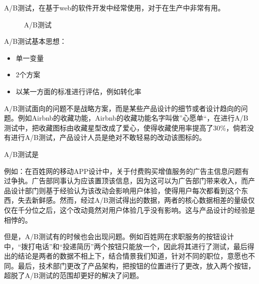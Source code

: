 \documentclass[letterpaper,11pt,english]{sphinxmanual}
\begin{document}
A/B测试，在基于web的软件开发中经常使用，对于在生产中非常有用。

\begin{figure}[H]
\centering
\capstart

\noindent{}
\caption{A/B测试\sphinxfootnotemark[866]}\label{\detokenize{chapter_AI_dive/huidu:id3}}\end{figure}
%
\begin{footnotetext}[866]\sphinxAtStartFootnote
{}
%
\end{footnotetext}\ignorespaces 
A/B测试基本思想：
\begin{itemize}
\item {} 
单一变量

\item {} 
2个方案

\item {} 
以某一方面的标准进行评估，例如转化率

\end{itemize}

A/B测试面向的问题不是战略方案，而是某些产品设计的细节或者设计趋向的问题。例如Airbnb的收藏功能，Airbnb的收藏功能名字叫做”心愿单“，在进行A/B测试中，把收藏图标由收藏星型改成了爱心，使得收藏使用率提高了30\%，倘若没有进行A/B测试，产品设计人员是绝对不敢轻易的改动该图标的。

A/B测试是

例如：在百姓网的移动APP设计中，关于付费购买增值服务的广告主信息问题有过争执。广告部同事认为应该置顶该信息，因为这可以为广告部门带来收入，而产品设计部门则基于经验认为该改动会影响用户体验，使得用户每次都看到这个东西，失去新鲜感。然而，经过A/B测试得出的数据，两者的核心数据相差的量级仅仅在千分位之后，这个改动竟然对用户体验几乎没有影响。这与产品设计的经验是相悖的。

但是，A/B测试有的时候也会出现问题。例如百姓网在求职服务的按钮设计中，“拨打电话”和“投递简历”两个按钮只能放一个，因此将其进行了测试，最后得出的结论是两者的数据不相上下，结合情景我们知道，针对不同的职位，意愿也不同。最后，技术部门更改了产品架构，把按钮的位置进行了更改，放入两个按钮，超脱了A/B测试的范围却更好的解决了问题。

%
\begin{footnote}[867]\sphinxAtStartFootnote
{}
%
\end{footnote}
\end{document}
